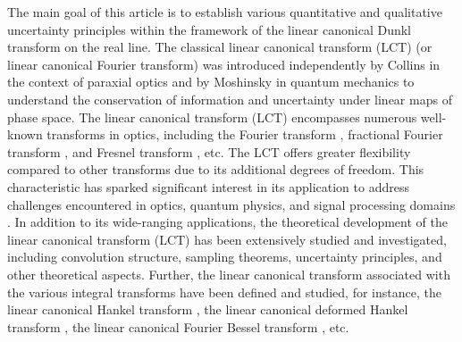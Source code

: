 \documentclass[12pt,a4paper,reqno]{amsproc}
\theoremstyle{definition}
\theoremstyle{remark}
\numberwithin{equation}{section}
\begin{document}
\par { The main goal of this article is to establish various quantitative and qualitative uncertainty principles within the framework of the linear canonical Dunkl transform on the real line. }
{The classical linear canonical transform (LCT) (or linear canonical Fourier transform)  was introduced independently by Collins \cite{Collins} in the context of paraxial optics and by Moshinsky \cite{Moshinsky} in quantum mechanics to understand the conservation of information and uncertainty under linear maps of phase space.
The linear canonical transform (LCT) encompasses numerous well-known transforms in optics, including the Fourier transform \cite{almeida1993introduction}, fractional Fourier transform \cite{alieva1994fractional, alieva1999mode, namias1980fractional}, and Fresnel transform \cite{james1996generalized}, etc. The LCT offers greater flexibility compared to other transforms due to its additional degrees of freedom. This characteristic has sparked significant interest in its application to address challenges encountered in optics, quantum physics, and signal processing domains \cite{ballentine1970statistical, cramer1986transactional, eskov2014uncertainty, faris1978inequalities, hilgevoord1996uncertainty, uffink1985uncertainty}.
In addition to its wide-ranging applications, the theoretical development of the linear canonical transform (LCT) has been extensively studied and investigated, including convolution structure, sampling theorems, uncertainty principles, and other theoretical aspects. Further, the linear canonical transform associated with the various integral transforms have been defined and studied, for instance, the linear canonical Hankel transform \cite{prasad, srivastava2021framework}, the linear canonical deformed Hankel transform \cite{mejjaoli2023linear}, the linear canonical Fourier Bessel transform \cite{dhaouadi2021harmonic}, etc. }
\end{document}
